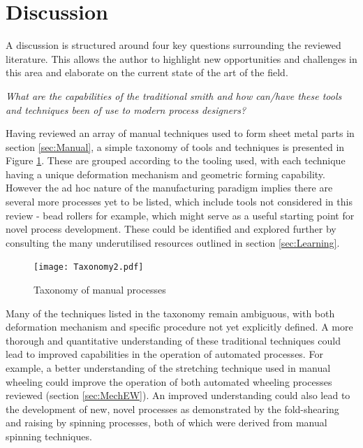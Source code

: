 

\section{Discussion}\label{sec:discussion}

A discussion is structured around four key questions surrounding the reviewed literature. This allows the author to highlight new opportunities and challenges in this area and elaborate on the current state of the art of the field.

\newcommand{\question}[1]{\vspace{1em} \noindent \textit{#1} \vspace{0.5em}}

\question{What are the capabilities of the traditional smith and how can/have these tools and techniques been of use to modern process designers?}

Having reviewed an array of manual techniques used to form sheet metal parts in section \ref{sec:Manual}, a simple taxonomy of tools and techniques is presented in Figure \ref{fig:ManualTaxonomy}. These are grouped according to the tooling used, with each technique having a unique deformation mechanism and geometric forming capability. However the ad hoc nature of the manufacturing paradigm implies there are several more processes yet to be listed, which include tools not considered in this review - bead rollers for example, which might serve as a useful starting point for novel process development. These could be identified and explored further by consulting the many underutilised resources outlined in section \ref{sec:Learning}.

\begin{figure}[h]
	\centering
    \texttt{[image: Taxonomy2.pdf]}
    \caption{Taxonomy of manual processes}
    \label{fig:ManualTaxonomy}
\end{figure}

Many of the techniques listed in the taxonomy remain ambiguous, with both deformation mechanism and specific procedure not yet explicitly defined. A more thorough and quantitative understanding of these traditional techniques could lead to improved capabilities in the operation of automated processes. For example, a better understanding of the stretching technique used in manual wheeling could improve the operation of both automated wheeling processes reviewed (section \ref{sec:MechEW}). An improved understanding could also lead to the development of new, novel processes as demonstrated by the fold-shearing \citep{Allwood2019Folding-shearing:Change} and raising by spinning \citep{Russo2020RaisingSpinning} processes, both of which were derived from manual spinning techniques.


